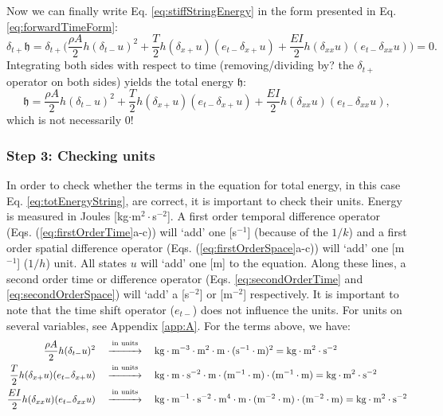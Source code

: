 \documentclass{article}
\begin{document}
Now we can finally write Eq. \eqref{eq:stiffStringEnergy} in the form presented in Eq. \eqref{eq:forwardTimeForm}:
\begin{equation}
    \delta_{t+}\mathfrak{h} = \delta_{t+}\Bigg(\frac{\rho A}{2}h(\delta_{t-}u)^2 + \frac{T}{2}h (\delta_{x+}u)( e_{t-}\delta_{x+}u) +\frac{EI}{2}h(\delta_{xx}u)(e_{t-}\delta_{xx}u)\Bigg) = 0.
\end{equation}
Integrating both sides with respect to time (removing/dividing by? the $\delta_{t+}$ operator on both sides) yields the total energy $\mathfrak{h}$:
\begin{equation}\label{eq:totEnergyString}
    \mathfrak{h} = \frac{\rho A}{2}h(\delta_{t-}u)^2 + \frac{T}{2}h (\delta_{x+}u)( e_{t-}\delta_{x+}u) +\frac{EI}{2}h(\delta_{xx}u)(e_{t-}\delta_{xx}u),
\end{equation}
which is not necessarily 0! 

\subsubsection*{Step 3: Checking units}
In order to check whether the terms in the equation for total energy, in this case Eq. \eqref{eq:totEnergyString}, are correct, it is important to check their units. Energy is measured in Joules [kg$\cdot$m$^2\cdot$s$^{-2}$]. A first order temporal difference operator (Eqs. (\ref{eq:firstOrderTime}a-c)) will `add' one [s$^{-1}$] (because of the $1/k$) and a first order spatial difference operator (Eqs. (\ref{eq:firstOrderSpace}a-c)) will `add' one [m$^{-1}$] ($1/h$) unit. All states $u$ will `add' one [m] to the equation. Along these lines, a second order time or difference operator (Eqs. \eqref{eq:secondOrderTime} and \eqref{eq:secondOrderSpace}) will `add' a [s$^{-2}$] or [m$^{-2}$] respectively. It is important to note that the time shift operator ($e_{t-}$) does not influence the units. For units on several variables, see Appendix \ref{app:A}. For the terms above, we have:
\begin{subequations}
\begin{align}
\frac{\rho A}{2}h(\delta_{t-}u)^2 \quad
&\overset{\text{in units}}{\xrightarrow{\hspace*{1cm}}}    \quad\text{kg}\cdot\text{m}^{-3}\cdot\text{m}^2\cdot\text{m}\cdot(\text{s}^{-1}\cdot\text{m})^2 = \text{kg}\cdot\text{m}^2\cdot\text{s}^{-2}\\
\frac{T}{2}h (\delta_{x+}u)( e_{t-}\delta_{x+}u) \quad
&\overset{\text{in units}}{\xrightarrow{\hspace*{1cm}}}    \quad\text{kg}\cdot\text{m}\cdot\text{s}^{-2}\cdot\text{m}\cdot(\text{m}^{-1}\cdot\text{m})\cdot(\text{m}^{-1}\cdot\text{m}) = \text{kg}\cdot\text{m}^2\cdot\text{s}^{-2}\\
\frac{EI}{2}h (\delta_{xx}u)( e_{t-}\delta_{xx}u) \quad
&\overset{\text{in units}}{\xrightarrow{\hspace*{1cm}}}    \quad\text{kg}\cdot\text{m}^{-1}\cdot\text{s}^{-2}\cdot\text{m}^4\cdot\text{m}\cdot(\text{m}^{-2}\cdot\text{m})\cdot(\text{m}^{-2}\cdot\text{m}) = \text{kg}\cdot\text{m}^2\cdot\text{s}^{-2}
\end{align}
\end{subequations}
\end{document}
